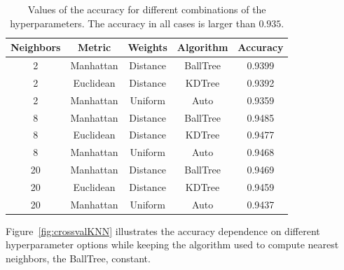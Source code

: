 \begin{table}[h]
\begin{tabular}{c|c|c|c|c}
\hline
Neighbors   & Metric & Weights & Algorithm & \multicolumn{1}{|c}{Accuracy} \\ \hline
2                                   & Manhattan                   & Distance                    & BallTree                   &  0.9399                                  \\
2                                   & Euclidean                   & Distance                    & KDTree                   & 0.9392                           \\
2                                   & Manhattan                   & Uniform                    & Auto             &                    0.9359  \\
8                                   & Manhattan                  & Distance                   & BallTree &                    0.9485 \\
8                                   & Euclidean                 & Distance                   & KDTree             &                       0.9477 \\               
8                                   & Manhattan                   & Uniform                   & Auto              &                          0.9468 \\
20                                   & Manhattan                   & Distance                   & BallTree &                  0.9469 \\
20                                   & Euclidean                   & Distance                   & KDTree              &                       0.9459 \\               
20                                   & Manhattan                   & Uniform                   & Auto              &                          0.9437 \\
\hline
\end{tabular}
\caption{Values of the accuracy for different combinations of the hyperparameters. The accuracy in all cases is larger than $0.935$.}
\label{tab:KNN_crossval_tab}
\end{table}

Figure~\ref{fig:crossvalKNN} illustrates the accuracy dependence on different hyperparameter options while keeping the algorithm used to compute nearest neighbors, the BallTree, constant.

